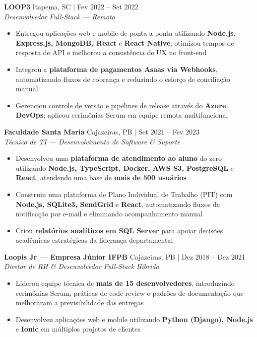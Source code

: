 \documentclass[a4paper]{article}
\begin{document}
\vspace{2mm}

\textbf{LOOP3} \hfill Itapema, SC | Fev 2022 -- Set 2022\\
\textit{Desenvolvedor Full-Stack — Remoto}\\
\vspace{-3mm}
\begin{itemize}[leftmargin=*, itemsep=-3pt]
    \item Entregou aplicações web e mobile de ponta a ponta utilizando \textbf{Node.js, Express.js, MongoDB, React} e \textbf{React Native}; otimizou tempos de resposta de API e melhorou a consistência de UX no front-end
    \item Integrou a \textbf{plataforma de pagamentos Asaas via Webhooks}, automatizando fluxos de cobrança e reduzindo o esforço de conciliação manual
    \item Gerenciou controle de versão e pipelines de release através do \textbf{Azure DevOps}; aplicou cerimônias Scrum em equipe remota multifuncional
\end{itemize}

\vspace{2mm}

\textbf{Faculdade Santa Maria} \hfill Cajazeiras, PB | Set 2021 -- Fev 2023\\
\textit{Técnico de TI — Desenvolvimento de Software \& Suporte}\\
\vspace{-3mm}
\begin{itemize}[leftmargin=*, itemsep=-3pt]
    \item Desenvolveu uma \textbf{plataforma de atendimento ao aluno} do zero utilizando \textbf{Node.js, TypeScript, Docker, AWS S3, PostgreSQL} e \textbf{React}, atendendo uma base de \textbf{mais de 500 usuários}
    \item Construiu uma plataforma de Plano Individual de Trabalho (PIT) com \textbf{Node.js, SQLite3, SendGrid} e \textbf{React}, automatizando fluxos de notificação por e-mail e eliminando acompanhamento manual
    \item Criou \textbf{relatórios analíticos em SQL Server} para apoiar decisões acadêmicas estratégicas da liderança departamental
\end{itemize}

\vspace{2mm}

\textbf{Loopis Jr — Empresa Júnior IFPB} \hfill Cajazeiras, PB | Dez 2018 -- Dez 2021\\
\textit{Diretor de RH \& Desenvolvedor Full-Stack} \hfill \textit{Híbrido}\\
\vspace{-3mm}
\begin{itemize}[leftmargin=*, itemsep=-3pt]
    \item Liderou equipe técnica de \textbf{mais de 15 desenvolvedores}, introduzindo cerimônias Scrum, práticas de code review e padrões de documentação que melhoraram a previsibilidade das entregas
    \item Desenvolveu aplicações web e mobile utilizando \textbf{Python (Django), Node.js} e \textbf{Ionic} em múltiplos projetos de clientes
\end{itemize}
\end{document}
